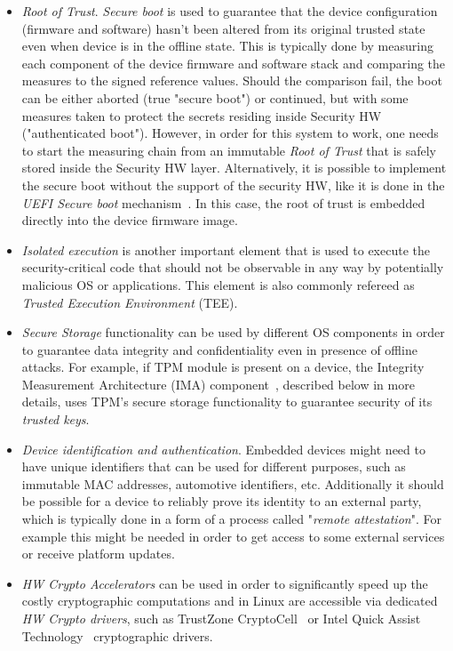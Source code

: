 \begin{itemize}
	\item \textit{Root of Trust}. \textit{Secure boot} is used to guarantee that the device configuration (firmware and software) hasn't been altered from its original trusted state even when device is in the offline state. This is typically done by measuring each component of the device firmware and software stack and comparing the measures to the signed reference values. Should the comparison fail, the boot can be either aborted (true "secure boot") or continued, but with some measures taken to protect the secrets residing inside Security HW ("authenticated boot"). However, in order for this system to work, one needs to start the measuring chain from an immutable \textit{Root of Trust} that is safely stored inside the Security HW layer. Alternatively, it is possible to implement the secure boot without the support of the security HW, like it is done in the \textit{UEFI Secure boot} mechanism~\cite{uefi}. In this case, the root of trust is embedded directly into the device firmware image. 
	\item \textit{Isolated execution} is another important element that is used to execute the security-critical code that should not be observable in any way by potentially malicious OS or applications. This element is also commonly refereed as \textit{Trusted Execution Environment} (TEE).
	\item \textit{Secure Storage} functionality can be used by different OS components in order to guarantee data integrity and confidentiality even in presence of offline attacks. For example, if TPM module is present on a device, the Integrity Measurement Architecture (IMA) component~\cite{ima}, described below in more details, uses TPM's secure storage functionality to guarantee security of its \textit{trusted keys}.
	\item \textit{Device identification and authentication}. Embedded devices might need to have unique identifiers that can be used for different purposes, such as immutable MAC addresses, automotive identifiers, etc.  Additionally it should be possible for a device to reliably prove its identity to an external party, which is typically done in a form of a process called "\textit{remote attestation}". For example this might be needed in order to get access to some external services or receive platform updates.
	\item \textit{HW Crypto Accelerators} can be used in order to significantly speed up the costly cryptographic computations and in Linux are accessible via dedicated \textit{HW Crypto drivers}, such as TrustZone CryptoCell~\cite{cryptocell} or Intel Quick Assist Technology~\cite{intelQAT} cryptographic drivers.
\end{itemize}


